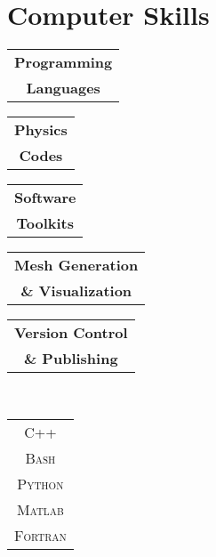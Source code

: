%
%
\section{Computer Skills}
\begin{minipage}{0.2\textwidth}
\begin{tabular}{c}
{\large\textbf{Programming}}\\
{\large\textbf{Languages}}\\
\end{tabular}
\end{minipage}%
\begin{minipage}{0.15\textwidth}
\begin{tabular}{c}
{\large\textbf{Physics}}\\
{\large\textbf{Codes}}\\
\end{tabular}
\end{minipage}%
\begin{minipage}{0.15\textwidth}
\begin{tabular}{c}
{\large\textbf{Software}}\\
{\large\textbf{Toolkits}}\\
\end{tabular}
\end{minipage}%
\begin{minipage}{0.24\textwidth}
\begin{tabular}{c}
	{\large\textbf{Mesh Generation}}\\
	{\large\textbf{ \& Visualization}}\\
\end{tabular}
\end{minipage}%
\begin{minipage}{0.24\textwidth}
\begin{tabular}{c}
	{\large\textbf{Version Control}}\\
	{\large\textbf{\& Publishing}}\\
\end{tabular}
\end{minipage}
\\[1mm]
\begin{minipage}{0.2\textwidth}
\begin{tabular}{c}
               \textsc{C++} \\
               \textsc{Bash} \\
               \textsc{Python} \\
               \textsc{Matlab} \\
               \textsc{Fortran} \\
\end{tabular}
\end{minipage}%
